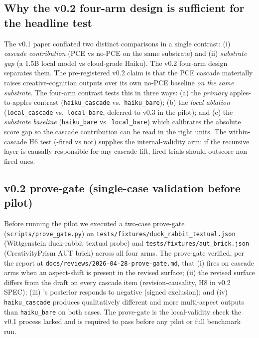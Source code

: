 \subsection{Why the v0.2 four-arm design is sufficient for the headline test}

The v0.1 paper conflated two distinct comparisons in a single contrast: (i) \emph{cascade contribution} (PCE vs no-PCE on the same substrate) and (ii) \emph{substrate gap} (a 1.5B local model vs cloud-grade Haiku). The v0.2 four-arm design separates them. The pre-registered v0.2 claim is that the PCE cascade materially raises creative-cognition outputs over its own no-PCE baseline \emph{on the same substrate}. The four-arm contrast tests this in three ways: (a) the \emph{primary} apples-to-apples contrast (\texttt{haiku\_cascade} vs.\ \texttt{haiku\_bare}); (b) the \emph{local ablation} (\texttt{local\_cascade} vs.\ \texttt{local\_bare}, deferred to v0.3 in the pilot); and (c) the \emph{substrate baseline} (\texttt{haiku\_bare} vs.\ \texttt{local\_bare}) which calibrates the absolute score gap so the cascade contribution can be read in the right units. The within-cascade H6 test (-fired vs not) supplies the internal-validity arm: if the recursive layer is causally responsible for any cascade lift, fired trials should outscore non-fired ones.

\subsection{v0.2 prove-gate (single-case validation before pilot)}

Before running the pilot we executed a two-case prove-gate (\texttt{scripts/prove\_gate.py}) on \texttt{tests/fixtures/duck\_rabbit\_textual.json} (Wittgenstein duck-rabbit textual probe) and \texttt{tests/fixtures/aut\_brick.json} (CreativityPrism AUT brick) across all four arms. The prove-gate verified, per the report at \texttt{docs/reviews/2026-04-28-prove-gate.md}, that (i)  fires on cascade arms when an aspect-shift is present in the revised surface; (ii) the revised surface differs from the draft on every cascade item (revision-causality, H8 in v0.2 SPEC); (iii) 's posterior responds to negative  (signed exclusion); and (iv) \texttt{haiku\_cascade} produces qualitatively different and more multi-aspect outputs than \texttt{haiku\_bare} on both cases. The prove-gate is the local-validity check the v0.1 process lacked and is required to pass before any pilot or full benchmark run.
